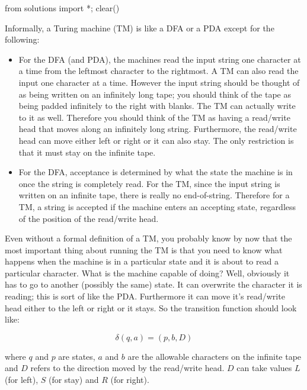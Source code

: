 \begin{python0}
from solutions import *; clear()
\end{python0}


Informally, a Turing machine (TM) is like a DFA or a PDA except for
the following:
\begin{itemize}
\item For the DFA (and PDA), the machines read the input string one
 character at a time from the leftmost character to the rightmost. A
 TM can also read the input one character at a time. However
 the input string should be thought of as being written on an
 infinitely long tape; you should think of the tape as being padded
 infinitely to the right with blanks. The TM can actually write to it
 as well. Therefore you should think of the TM as having a read/write
 head that moves along an infinitely long string.
 Furthermore, the read/write head can move either
 left or right or it can also stay. The only restriction is that it
 must stay on the infinite tape.
\item For the DFA, acceptance is
 determined by what the state the machine is in once the string is
 completely read. For the TM, since the input string is written on an
 infinite tape, there is really no end-of-string. Therefore for a TM, a string is
 accepted if the machine enters an accepting state, regardless of the
 position of the read/write head.
\end{itemize}

Even without a formal definition of a TM, you probably know by now
that the most important thing about running the TM is that you need
to know what happens when the machine is in a particular state and
it is about to read a particular character. What is the machine
capable of doing? Well, obviously it has to go to another (possibly
the same) state. It can overwrite the character it is reading; this
is sort of like the PDA. Furthermore it can move it's read/write
head either to the left or right or it stays. So the transition
function should look like:

\[\delta(q, a) = (p, b, D)\]

where $q$ and $p$ are states, $a$ and $b$ are the allowable
characters on the infinite tape and $D$ refers to the direction
moved by the read/write head. $D$ can take values $L$ (for left),
$S$ (for stay) and $R$ (for right).
